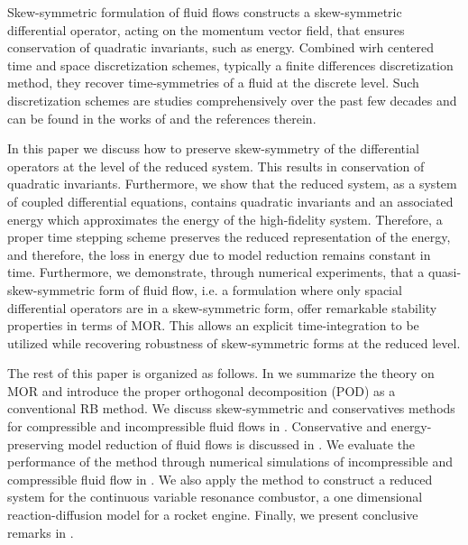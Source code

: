 Skew-symmetric formulation of fluid flows constructs a skew-symmetric differential operator, acting on the momentum vector field, that ensures conservation of quadratic invariants, such as energy. Combined wirh centered time and space discretization schemes, typically a finite differences discretization method, they recover time-symmetries of a fluid at the discrete level. Such discretization schemes are studies comprehensively over the past few decades and can be found in the works of \cite{morinishi2010skew,morinishi1998fully,desjardins2008high,tadmor1984skew,reiss2014conservative} and the references therein.

In this paper we discuss how to preserve skew-symmetry of the differential operators at the level of the reduced system. This results in conservation of quadratic invariants. Furthermore, we show that the reduced system, as a system of coupled differential equations, contains quadratic invariants and an associated energy which approximates the energy of the high-fidelity system. Therefore, a proper time stepping scheme preserves the reduced representation of the energy, and therefore, the loss in energy due to model reduction remains constant in time. Furthermore, we demonstrate, through numerical experiments, that a quasi-skew-symmetric form of fluid flow, i.e. a formulation where only spacial differential operators are in a skew-symmetric form, offer remarkable stability properties in terms of MOR. This allows an explicit time-integration to be utilized while recovering robustness of skew-symmetric forms at the reduced level.

The rest of this paper is organized as follows. In  we summarize the theory on MOR and introduce the proper orthogonal decomposition (POD) as a conventional RB method. We discuss skew-symmetric and conservatives methods for compressible and incompressible fluid flows in . Conservative and energy-preserving model reduction of fluid flows is discussed in . We evaluate the performance of the method through numerical simulations of incompressible and compressible fluid flow in . We also apply the method to construct a reduced system for the continuous variable resonance combustor, a one dimensional reaction-diffusion model for a rocket engine. Finally, we present conclusive remarks in .
